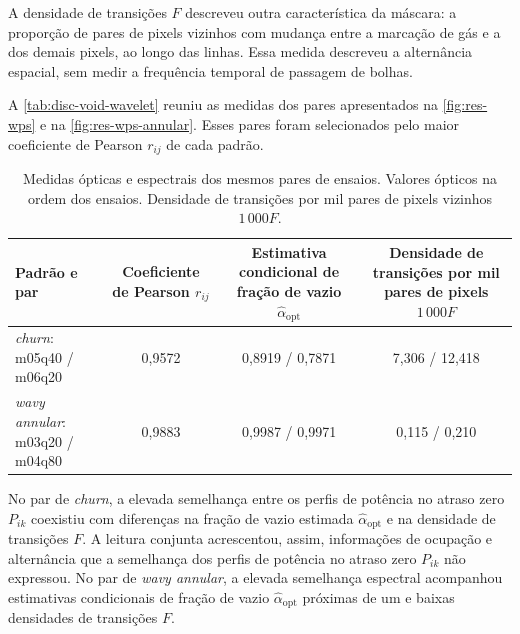 A densidade de transições $F$ descreveu outra característica da máscara:
a proporção de pares de pixels vizinhos com mudança entre a marcação de
gás e a dos demais pixels, ao longo das linhas. Essa medida descreveu a
alternância espacial, sem medir a frequência temporal de passagem de bolhas.

A \autoref{tab:disc-void-wavelet} reuniu as medidas dos pares apresentados
na \autoref{fig:res-wps} e na \autoref{fig:res-wps-annular}.
Esses pares foram selecionados pelo maior coeficiente de Pearson $r_{ij}$
de cada padrão.

\begin{table}[!htbp]
  \centering
  \begin{threeparttable}
  \caption[Comparação complementar de medidas ópticas e espectrais nos mesmos pares de aquisições.]{Medidas
  ópticas e espectrais dos mesmos pares de ensaios. Valores ópticos na ordem
  dos ensaios. Densidade de transições por mil pares de pixels vizinhos $1\,000F$.}
  \label{tab:disc-void-wavelet}
  \small
  \begin{tabular}{p{3.1cm} c c c}
    \hline
    \textbf{Padrão e par} &
    \shortstack{\textbf{Coeficiente de}\\\textbf{Pearson $r_{ij}$}} &
    \shortstack{\textbf{Estimativa condicional}\\\textbf{de fração de vazio $\widehat\alpha_{\mathrm{opt}}$}} &
    \shortstack{\textbf{Densidade de}\\\textbf{transições por mil}\\\textbf{pares de pixels $1\,000F$}}\\
    \hline
    \textit{churn}: m05q40 / m06q20 & 0,9572 & 0,8919 / 0,7871 & 7,306 / 12,418\\
    \textit{wavy annular}: m03q20 / m04q80 & 0,9883 & 0,9987 / 0,9971 & 0,115 / 0,210\\
    \hline
  \end{tabular}
  \end{threeparttable}
\end{table}

No par de \textit{churn}, a elevada semelhança entre os perfis de potência
no atraso zero $P_{ik}$
coexistiu com diferenças na fração de vazio estimada
$\widehat\alpha_{\mathrm{opt}}$ e na densidade de transições $F$.
A leitura conjunta acrescentou, assim, informações de ocupação e alternância
que a semelhança dos perfis de potência no atraso zero $P_{ik}$ não expressou.
No par de \textit{wavy annular},
a elevada semelhança espectral acompanhou estimativas condicionais de fração
de vazio $\widehat\alpha_{\mathrm{opt}}$ próximas de um e baixas densidades
de transições $F$.

